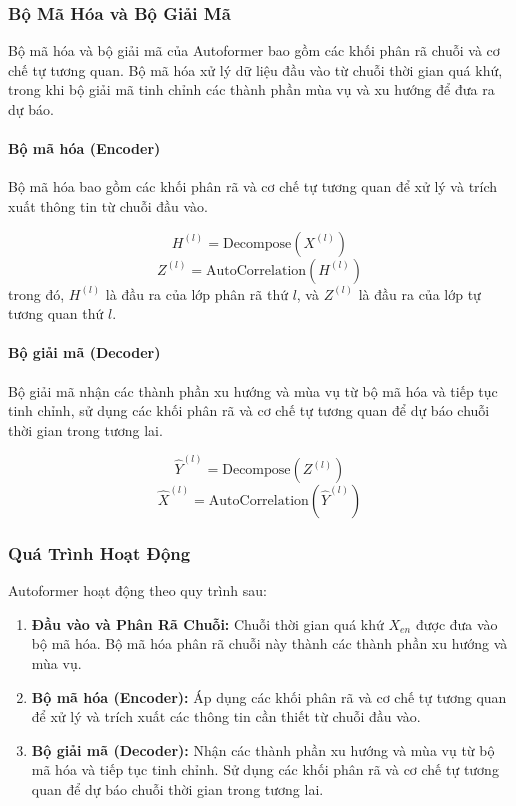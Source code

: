 \subsubsection{Bộ Mã Hóa và Bộ Giải Mã}

Bộ mã hóa và bộ giải mã của Autoformer bao gồm các khối phân rã chuỗi và cơ chế tự tương quan. Bộ mã hóa xử lý dữ liệu đầu vào từ chuỗi thời gian quá khứ, trong khi bộ giải mã tinh chỉnh các thành phần mùa vụ và xu hướng để đưa ra dự báo.

\paragraph{Bộ mã hóa (Encoder)}

Bộ mã hóa bao gồm các khối phân rã và cơ chế tự tương quan để xử lý và trích xuất thông tin từ chuỗi đầu vào.

\[
H^{(l)} = \text{Decompose}(X^{(l)})
\]
\[
Z^{(l)} = \text{AutoCorrelation}(H^{(l)})
\]
trong đó, $H^{(l)}$ là đầu ra của lớp phân rã thứ $l$, và $Z^{(l)}$ là đầu ra của lớp tự tương quan thứ $l$.

\paragraph{Bộ giải mã (Decoder)}

Bộ giải mã nhận các thành phần xu hướng và mùa vụ từ bộ mã hóa và tiếp tục tinh chỉnh, sử dụng các khối phân rã và cơ chế tự tương quan để dự báo chuỗi thời gian trong tương lai.

\[
\hat{Y}^{(l)} = \text{Decompose}(Z^{(l)})
\]
\[
\hat{X}^{(l)} = \text{AutoCorrelation}(\hat{Y}^{(l)})
\]

\subsubsection{Quá Trình Hoạt Động}

Autoformer hoạt động theo quy trình sau:

\begin{enumerate}
    \item \textbf{Đầu vào và Phân Rã Chuỗi:} Chuỗi thời gian quá khứ $X_{en}$ được đưa vào bộ mã hóa. Bộ mã hóa phân rã chuỗi này thành các thành phần xu hướng và mùa vụ.
    \item \textbf{Bộ mã hóa (Encoder):} Áp dụng các khối phân rã và cơ chế tự tương quan để xử lý và trích xuất các thông tin cần thiết từ chuỗi đầu vào.
    \item \textbf{Bộ giải mã (Decoder):} Nhận các thành phần xu hướng và mùa vụ từ bộ mã hóa và tiếp tục tinh chỉnh. Sử dụng các khối phân rã và cơ chế tự tương quan để dự báo chuỗi thời gian trong tương lai.
\end{enumerate}
